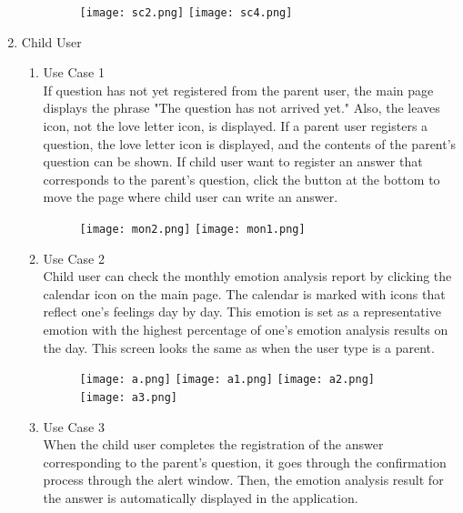 \documentclass[conference]{IEEEtran}
\begin{document}
\begin{enumerate}
\begin{enumerate}
        \begin{figure}[H]
        \centering
        \texttt{[image: sc2.png]}
        \texttt{[image: sc4.png]}
        \end{figure}
    \end{enumerate}
    \newpage
    \item Child User
    \begin{enumerate}
        \begin{figure}[H]
        \centering
        \texttt{[image: ch1.png]}
        \texttt{[image: ch2.png]}
        \end{figure}
        \item Use Case 1 
        \\If question has not yet registered from the parent user, the main page displays the phrase "The question has not arrived yet." Also, the leaves icon, not the love letter icon, is displayed. If a parent user registers a question, the love letter icon is displayed, and the contents of the parent's question can be shown. If child user want to register an answer that corresponds to the parent’s question, click the button at the bottom to move the page where child user can write an answer.
        \begin{figure}[H]
         \centering
         \texttt{[image: mon2.png]}
         \texttt{[image: mon1.png]}
         \end{figure}
        \item Use Case 2
        \\Child user can check the monthly emotion analysis report by clicking the calendar icon on the main page. The calendar is marked with icons that reflect one's feelings day by day. This emotion is set as a representative emotion with the highest percentage of one's emotion analysis results on the day. This screen looks the same as when the user type is a parent.
        \begin{figure}[H]
        \centering
        \texttt{[image: a.png]}
        \texttt{[image: a1.png]}
        \texttt{[image: a2.png]}
        \texttt{[image: a3.png]}
        \end{figure}
        \newpage
        \item Use Case 3
        \\When the child user completes the registration of the answer corresponding to the parent's question, it goes through the confirmation process through the alert window. Then, the emotion analysis result for the answer is automatically displayed in the application.
    \end{enumerate}
\end{enumerate}
\end{document}
